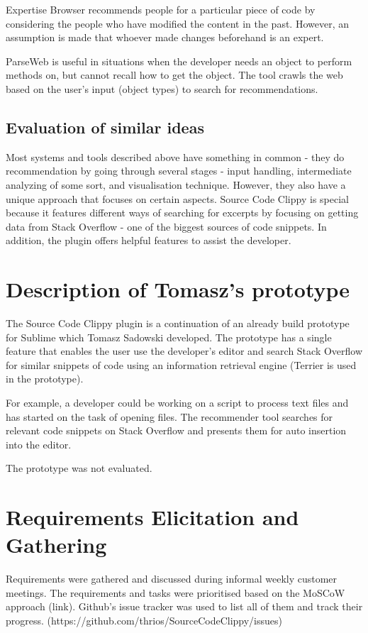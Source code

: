 \documentclass{l4proj}
\begin{document}
Expertise Browser recommends people for a particular piece of code by considering the people who have modified the content in the past. However, an assumption is made that whoever made changes beforehand is an expert.

ParseWeb is useful in situations when the developer needs an object to perform methods on, but cannot recall how to get the object. The tool crawls the web based on the user's input (object types) to search for recommendations.

\subsection{Evaluation of similar ideas}
Most systems and tools described above have something in common - they do recommendation by going through several stages - input handling, intermediate analyzing of some sort, and visualisation technique. However, they also have a unique approach that focuses on certain aspects. Source Code Clippy is special because it features different ways of searching for excerpts by focusing on getting data from Stack Overflow - one of the biggest sources of code snippets. In addition, the plugin offers helpful features to assist the developer.


\section{Description of Tomasz's prototype}
The Source Code Clippy plugin is a continuation of an already build prototype for Sublime which Tomasz Sadowski developed. The prototype has a single feature that enables the user use the developer's editor and search Stack Overflow for similar snippets of code using an information retrieval engine (Terrier is used in the prototype). 

For example, a developer could be working on a script to process text files and has started on the task of opening files. The recommender tool searches for relevant code snippets on Stack Overflow and presents them for auto insertion into the editor. 

The prototype was not evaluated.

\section{Requirements Elicitation and Gathering}
Requirements were gathered and discussed during informal weekly customer meetings.
The requirements and tasks were prioritised based on the MoSCoW approach (link). Github's issue tracker was used to list all of them and track their progress. (https://github.com/thrios/SourceCodeClippy/issues)
\end{document}
